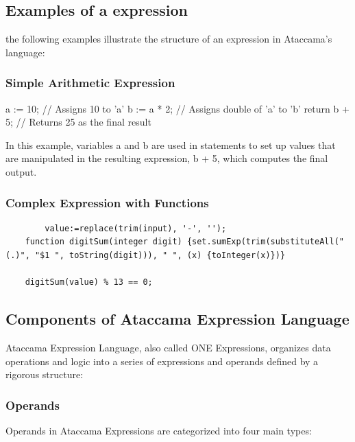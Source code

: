 \subsection{Examples of a expression}

the following examples illustrate the structure of an expression in Ataccama's language:

\subsubsection{Simple Arithmetic Expression}

a := 10;  // Assigns 10 to 'a'
b := a * 2;  // Assigns double of 'a' to 'b'
return b + 5;  // Returns 25 as the final result

In this example, variables a and b are used in statements to set up values that are manipulated in the resulting expression, b + 5, which computes the final output.

\subsubsection{Complex Expression with Functions}

\begin{verbatim}
        value:=replace(trim(input), '-', '');
    function digitSum(integer digit) {set.sumExp(trim(substituteAll("(.)", "$1 ", toString(digit))), " ", (x) {toInteger(x)})}

    digitSum(value) % 13 == 0;
\end{verbatim}


\subsection{Components of Ataccama Expression Language}

Ataccama Expression Language, also called ONE Expressions, organizes data operations and logic into a series of expressions and operands defined by a rigorous structure:


    \subsubsection{Operands}
    
    Operands in Ataccama Expressions are categorized into four main types:

